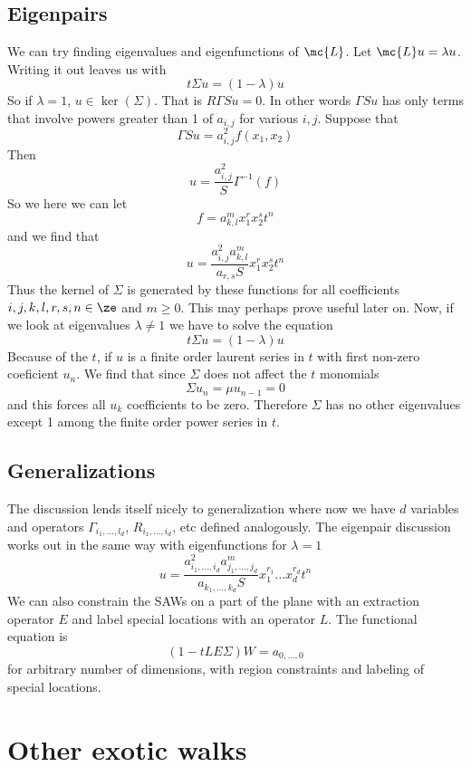 \subsection{Eigenpairs}
We can try finding eigenvalues and eigenfunctions of $\mc{L}$. Let $\mc{L}u = \lambda u$. Writing it out leaves us with
\[
	t\Sigma u = (1-\lambda)u
\]
So if $\lambda = 1$, $u\in \ker(\Sigma)$. That is $R\Gamma S u = 0$. In other words $\Gamma S u$ has only terms that involve powers greater than 1 of $a_{i,j}$ for various $i,j$. Suppose that
\[
	\Gamma S u = a_{i,j}^2 f(x_1,x_2)
\]
Then
\[
	u  = \frac{a_{i,j}^2}{S}\Gamma^{-1}(f)
\]
So we here we can let
\[
		f = a_{k,l}^m x_1^rx_2^s t^n
\]
and we find that
\[
	u =  \frac{a_{i,j}^2 a_{k,l}^m}{a_{r,s}S}x_1^r x_2^s t^n
\]
Thus the kernel of $\Sigma$ is generated by these functions for all coefficients $i,j,k,l,r,s,n \in \ze$ and $m\ge 0$. This may perhaps prove useful later on. Now, if we look at eigenvalues $\lambda \neq 1$ we have to solve the equation
\[
	t \Sigma u = (1-\lambda) u
\]
Because of the $t$, if $u$ is a finite order laurent series in $t$ with first non-zero coeficient $u_n$. We find that since $\Sigma$ does not affect the $t$ monomials
\[
	\Sigma u_n = \mu u_{n-1} = 0
\]
and this forces all $u_k$ coefficients to be zero. Therefore $\Sigma$ has no other eigenvalues except 1 among the finite order power series in $t$.
\subsection{Generalizations}

The discussion lends itself nicely to generalization where now we have $d$ variables and operators $\Gamma_{i_1,\ldots,l_d}$, $R_{i_1,\ldots,i_d}$, etc defined analogously. The eigenpair discussion works out in the same way with eigenfunctions for $\lambda = 1$
\[
	u = \frac{a_{i_1,\ldots,i_d}^2 a_{j_1,\ldots,j_d}^m}{a_{k_1,\ldots,k_d}S}x_1^{r_1}\ldots x_d^{r_d} t^n
\]
We can also constrain the SAWs on a part of the plane with an extraction operator $E$ and label special locations with an operator $L$. The functional equation is
\[
	(1- tLE\Sigma)W = a_{0,\ldots,0}
\]
for arbitrary number of dimensions, with region constraints and labeling of special locations.
\section{Other exotic walks}
\label{sec:Exotic}

